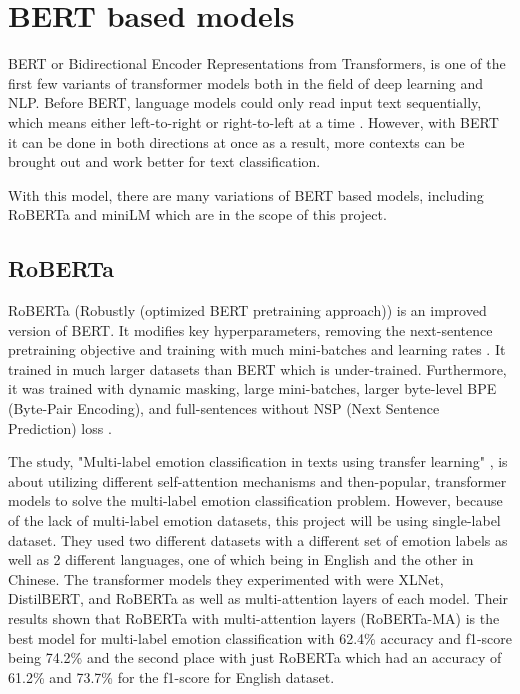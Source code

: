 \section{BERT based models}
BERT or Bidirectional Encoder Representations from Transformers, is one of the first few variants of transformer models both in the field of deep learning and NLP.
Before BERT, language models could only read input text sequentially, which means either left-to-right or right-to-left at a time \cite{Hashemi-Pour_Lutkevich_2024}.
However, with BERT it can be done in both directions at once \cite{Hashemi-Pour_Lutkevich_2024} as a result, more contexts can be brought out and work better for text classification.

With this model, there are many variations of BERT based models, including RoBERTa and miniLM which are in the scope of this project. 

\subsection{RoBERTa}
RoBERTa (Robustly (optimized BERT pretraining approach)) is an improved version of BERT.
It modifies key hyperparameters, removing the next-sentence pretraining objective and training with much mini-batches and learning rates \cite{Sharma_2022}.
It trained in much larger datasets than BERT which is under-trained. 
Furthermore, it was trained with dynamic masking, large mini-batches, larger byte-level BPE (Byte-Pair Encoding), and full-sentences without NSP (Next Sentence Prediction) loss \cite{Sharma_2022}.

The study, "Multi-label emotion classification in texts using transfer learning" \cite{AMEER2023118534}, is about utilizing different self-attention mechanisms and then-popular, transformer models to solve the multi-label emotion classification problem.
However, because of the lack of multi-label emotion datasets, this project will be using single-label dataset.
They used two different datasets with a different set of emotion labels as well as 2 different languages, one of which being in English and the other in Chinese.
The transformer models they experimented with were XLNet, DistilBERT, and RoBERTa as well as multi-attention layers of each model.
Their results shown that RoBERTa with multi-attention layers (RoBERTa-MA) is the best model for multi-label emotion classification with 62.4\% accuracy and f1-score being 74.2\% and the second place with just RoBERTa which had an accuracy of 61.2\% and 73.7\% for the f1-score for English dataset. 

